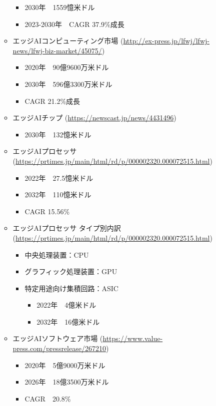 \begin{itemize}
\begin{itemize}
\begin{itemize}
			\item 2030年　1559憶米ドル
			\item 2023-2030年　CAGR 37.9\%成長
		\end{itemize}
		\item エッジAIコンピューティング市場 (\url{http://ex-press.jp/lfwj/lfwj-news/lfwj-biz-market/45075/})
		\begin{itemize}
			\item 2020年　90億9600万米ドル
			\item 2030年　596億3300万米ドル
			\item CAGR 21.2\%成長
		\end{itemize}
		\item エッジAIチップ (\url{https://newscast.jp/news/4431496})
		\begin{itemize}
			\item 2030年　132憶米ドル
		\end{itemize}
		\item エッジAIプロセッサ (\url{https://prtimes.jp/main/html/rd/p/000002320.000072515.html})
		\begin{itemize}
			\item 2022年　27.5憶米ドル
			\item 2032年　110憶米ドル
			\item CAGR 15.56\%
		\end{itemize}
		\item エッジAIプロセッサ タイプ別内訳 (\url{https://prtimes.jp/main/html/rd/p/000002320.000072515.html})
		\begin{itemize}
			\item 中央処理装置：CPU
			\item グラフィック処理装置：GPU
			\item 特定用途向け集積回路：ASIC
			\begin{itemize}
				\item 2022年　4億米ドル
				\item 2032年　16億米ドル
			\end{itemize}
		\end{itemize}
		\item エッジAIソフトウェア市場 (\url{https://www.value-press.com/pressrelease/267210})
		\begin{itemize}
			\item 2020年　5億9000万米ドル
			\item 2026年　18億3500万米ドル
			\item CAGR　20.8\%
		\end{itemize}
	\end{itemize}

\end{itemize}
